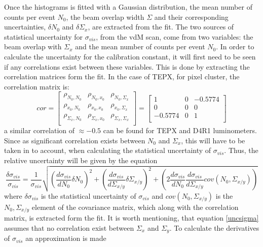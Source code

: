 Once the histograms is fitted with a Gaussian distribution, the mean number of counts per event $N_0$, the beam overlap width $\Sigma$ and their corresponding uncertainties, $\delta N_0$ and $\delta\Sigma_x$, are extracted from the fit. The two sources of statistical uncertainty for $\sigma_{vis}$, from the vdM scan, come from two variables: the beam overlap with $\Sigma_x$ and the mean number of counts per event $N_0$. In order to calculate the uncertainty for the calibration constant, it will first need to be seen if any correlations exist between these variables. This is done by extracting the correlation matrices form the fit. In the case of TEPX, for pixel cluster, the correlation matrix is:
\begin{equation}
    cor=\begin{bmatrix}
    \rho_{N_0,N_0}&\rho_{N_0,x_0}&\rho_{N_0,\Sigma_x}\\
    \rho_{x_0,N_0}&\rho_{x_0,x_0}&\rho_{x_0,\Sigma_x}\\
    \rho_{\Sigma_x,N_0}&\rho_{\Sigma_x,x_0}&\rho_{\Sigma_x,\Sigma_x}\\
    \end{bmatrix}=\begin{bmatrix}
    1&0&-0.5774\\
    0&0&0\\
    -0.5774&0&1\\
    \end{bmatrix}
\end{equation}
a similar correlation of $\approx-0.5$ can be found for TEPX and D4R1 luminometers. Since as significant correlation exists between $N_0$ and $\Sigma_x$, this will have to be taken in to account, when calculating the statistical uncertainty of $\sigma_{vis}$. Thus, the relative uncertainty will be given by the equation
\begin{equation}
    \frac{\delta\sigma_{vis}}{\sigma_{vis}}=\frac{1}{\sigma_{vis}}\sqrt{\left(\frac{d\sigma_{vis}}{dN_0}\delta N_0\right)^2+\left(\frac{d\sigma_{vis}}{d\Sigma_{x/y}}\delta\Sigma_{x/y}\right)^2+\left(2\frac{d\sigma_{vis}}{dN_0}\frac{d\sigma_{vis}}{d\Sigma_{x/y}}cov(N_0,\Sigma_{x/y})\right)}
    \label{uncsigma}
\end{equation}
where $\delta\sigma_{vis}$ is the statistical uncertainty of $\sigma_{vis}$ and $cov(N_0,\Sigma_{x/y})$ is the $N_0,\Sigma_{x/y}$ element of the covariance matrix, which along with the correlation matrix, is extracted form the fit. It is worth mentioning, that equation \ref{uncsigma} assumes that no correlation exist between $\Sigma_x$ and $\Sigma_y$. To calculate the derivatives of $\sigma_{vis}$ an approximation is made
